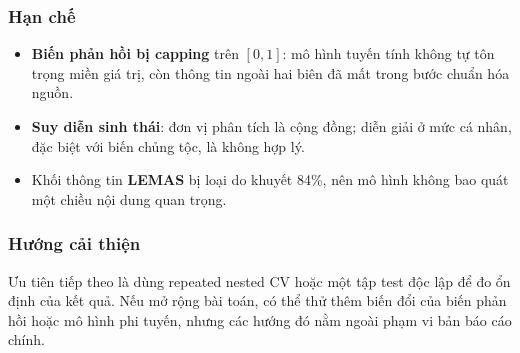 \subsubsection{Hạn chế}\label{hux1ea1n-chux1ebf}

\begin{itemize}
\tightlist
\item
  \textbf{Biến phản hồi bị capping} trên \([0,1]\): mô hình tuyến tính
  không tự tôn trọng miền giá trị, còn thông tin ngoài hai biên đã mất
  trong bước chuẩn hóa nguồn.
\item
  \textbf{Suy diễn sinh thái}: đơn vị phân tích là cộng đồng; diễn giải
  ở mức cá nhân, đặc biệt với biến chủng tộc, là không hợp lý.
\item
  Khối thông tin \textbf{LEMAS} bị loại do khuyết 84\%, nên mô hình
  không bao quát một chiều nội dung quan trọng.
\end{itemize}

\subsubsection{Hướng cải
thiện}\label{hux1b0ux1edbng-cux1ea3i-thiux1ec7n}

Ưu tiên tiếp theo là dùng repeated nested CV hoặc một tập test độc lập
để đo ổn định của kết quả. Nếu mở rộng bài toán, có thể thử thêm biến
đổi của biến phản hồi hoặc mô hình phi tuyến, nhưng các hướng đó nằm
ngoài phạm vi bản báo cáo chính.
